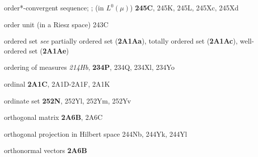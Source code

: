 order*-convergent sequence;
  ; 
  (in $L^0(\mu)$) {\bf 245C}, 245K, 245L, 245Xc, 245Xd
































order unit (in a Riesz space) 243C






ordered set {\it see} partially ordered set ({\bf 2A1Aa}), totally
ordered set ({\bf 2A1Ac}), well-ordered set ({\bf 2A1Ae})


ordering of measures {\it 214Hb}, 
{\bf 234P}, 234Q, 234Xl, 234Yo


ordinal {\bf 2A1C}, 2A1D-2A1F, 
2A1K










ordinate set {\bf 252N}, 252Yl, 252Ym, 252Yv














orthogonal matrix {\bf 2A6B}, 2A6C


orthogonal projection in Hilbert space 244Nb, 244Yk, 244Yl






orthonormal vectors {\bf 2A6B}
















